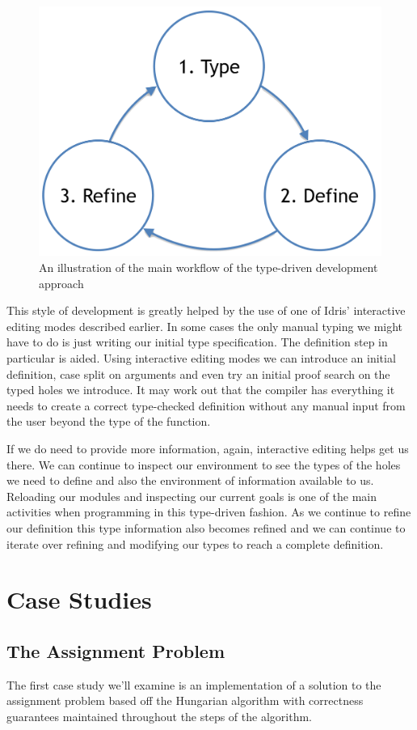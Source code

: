 \documentclass[a4paper, notitlepage]{report}
\begin{document}
\begin{figure}[H]
\centering
\includegraphics[width=0.8\linewidth]{./fig/tdd_cycle.png}
\caption{An illustration of the main workflow of the type-driven development approach}
\end{figure}

This style of development is greatly helped by the use of one of Idris'
interactive editing modes described earlier. In some cases the only manual
typing we might have to do is just writing our initial type specification. The
definition step in particular is aided. Using interactive editing modes we can
introduce an initial definition, case split on arguments and even try an initial
proof search on the typed holes we introduce. It may work out that the compiler
has everything it needs to create a correct type-checked definition without any
manual input from the user beyond the type of the function.

If we do need to provide more information, again, interactive editing helps get
us there. We can continue to inspect our environment to see the types of the
holes we need to define and also the environment of information available to us.
Reloading our modules and inspecting our current goals is one of the main
activities when programming in this type-driven fashion. As we continue to
refine our definition this type information also becomes refined and we can
continue to iterate over refining and modifying our types to reach a complete
definition.
\chapter{Case Studies}
\label{sec:org4d1a853}
\section{The Assignment Problem}
\label{sec:orga7510c7}
The first case study we'll examine is an implementation of a solution to the
assignment problem based off the Hungarian algorithm with correctness guarantees
maintained throughout the steps of the algorithm.
\end{document}
